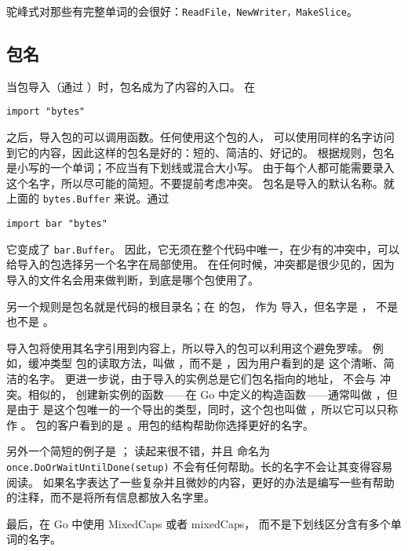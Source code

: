 驼峰式对那些有完整单词的会很好：\lstinline{ReadFile，NewWriter，MakeSlice}。

\subsection{包名}
当包导入（通过 ）时，包名成为了内容的入口。
在 
\begin{lstlisting}
import "bytes"
\end{lstlisting}
之后，导入包的可以调用函数。任何使用这个包的人，
可以使用同样的名字访问到它的内容，因此这样的包名是好的：短的、简洁的、好记的。
根据规则，包名是小写的一个单词；不应当有下划线或混合大小写。
由于每个人都可能需要录入这个名字，所以尽可能的简短。不要提前考虑冲突。
包名是导入的默认名称。就上面的 \lstinline{bytes.Buffer} 来说。通过 
\begin{lstlisting}
import bar "bytes"
\end{lstlisting}
它变成了 \lstinline{bar.Buffer}。
因此，它无须在整个代码中唯一，在少有的冲突中，可以给导入的包选择另一个名字在局部使用。
在任何时候，冲突都是很少见的，因为导入的文件名会用来做判断，到底是哪个包使用了。

另一个规则是包名就是代码的根目录名；在  的包，
作为  导入，但名字是 ，
不是  也不是 。

导入包将使用其名字引用到内容上，所以导入的包可以利用这个避免罗嗦。
例如，缓冲类型  包的读取方法，叫做 ，而不是
，因为用户看到的是  这个清晰、简洁的名字。
更进一步说，由于导入的实例总是它们包名指向的地址， 不会与
 冲突。相似的， 创建新实例的函数——在 Go 中定义的构造函数——通常叫做
，但是由于  是这个包唯一的一个导出的类型，同时，这个包也叫做
，所以它可以只称作 。
包的客户看到的是 。用包的结构帮助你选择更好的名字。

另外一个简短的例子是 ； 读起来很不错，并且
命名为 \lstinline{once.DoOrWaitUntilDone(setup)} 不会有任何帮助。长的名字不会让其变得容易阅读。
如果名字表达了一些复杂并且微妙的内容，更好的办法是编写一些有帮助的注释，而不是将所有信息都放入名字里。

最后，在 Go 中使用 MixedCaps 或者 mixedCaps，
而不是下划线区分含有多个单词的名字。

